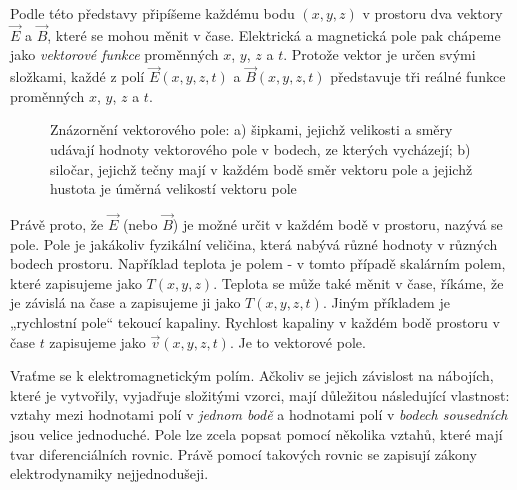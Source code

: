       Podle této představy připíšeme každému bodu \((x, y, z)\) v prostoru dva vektory \(\vec{E}\) 
      a \(\vec{B}\), které se mohou měnit v čase. Elektrická a magnetická pole pak chápeme jako 
      \emph{vektorové funkce} proměnných \(x\), \(y\), \(z\) a \(t\). Protože vektor je určen svými 
      složkami, každé z polí \(\vec{E}(x, y, z, t)\) a \(\vec{B}(x, y, z, t)\) představuje tři 
      reálné funkce proměnných \(x\), \(y\), \(z\) a \(t\).
      
      \begin{figure}[ht!]
        \centering
        \caption{Znázornění vektorového pole: a) šipkami, jejichž velikosti a směry  udávají
                hodnoty vektorového pole v bodech, ze kterých vycházejí; b) siločar, jejichž tečny
                mají v každém bodě směr vektoru pole a jejichž hustota je úměrná velikostí vektoru
                pole \cite[s.~17]{Feynman02}}
        \label{fyz:fig146}
      \end{figure} 
      Právě proto, že \(\vec{E}\) (nebo \(\vec{B}\)) je možné určit v každém bodě v prostoru, 
      nazývá se pole. Pole je jakákoliv fyzikální veličina, která nabývá různé hodnoty v různých 
      bodech prostoru. Například teplota je polem - v tomto případě skalárním polem, které 
      zapisujeme jako \(T(x, y, z)\). Teplota se může také měnit v čase, říkáme, že je závislá na 
      čase a zapisujeme ji jako \(T(x, y, z, t)\). Jiným příkladem  je „rychlostní pole“ tekoucí 
      kapaliny. Rychlost kapaliny v každém bodě prostoru v čase \(t\) zapisujeme jako \(\vec{v}(x, 
      y, z, t)\). Je to vektorové pole.
    
      Vraťme se k elektromagnetickým polím. Ačkoliv se jejich závislost na nábojích, které je 
      vytvořily, vyjadřuje složitými vzorci, mají důležitou následující vlastnost: vztahy mezi 
      hodnotami polí v \emph{jednom bodě} a hodnotami polí v \emph{bodech sousedních} jsou velice 
      jednoduché. Pole lze zcela popsat pomocí několika vztahů, které mají tvar diferenciálních 
      rovnic. Právě pomocí takových rovnic se zapisují zákony elektrodynamiky nejjednodušeji.
    
